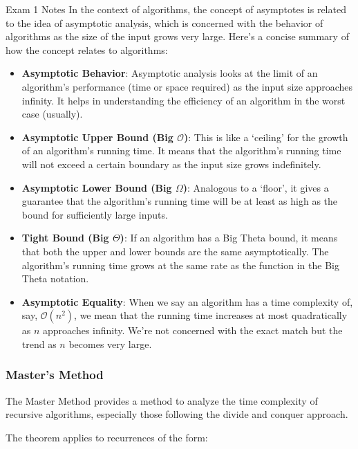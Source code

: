 \begin{examnotes}{Exam 1 Notes}
    In the context of algorithms, the concept of asymptotes is related to the idea of asymptotic analysis, which is concerned with the behavior of algorithms as the size of the input grows very large. 
    Here's a concise summary of how the concept relates to algorithms:

    \begin{itemize}
        \item \textbf{Asymptotic Behavior}: Asymptotic analysis looks at the limit of an algorithm's performance (time or space required) as the input size approaches infinity. It helps in understanding 
        the efficiency of an algorithm in the worst case (usually).
        \item \textbf{Asymptotic Upper Bound (Big $\mathcal{O}$)}: This is like a `ceiling' for the growth of an algorithm's running time. It means that the algorithm's running time will not exceed 
        a certain boundary as the input size grows indefinitely.
        \item \textbf{Asymptotic Lower Bound (Big $\Omega$)}: Analogous to a `floor', it gives a guarantee that the algorithm's running time will be at least as high as the bound for sufficiently 
        large inputs.
        \item \textbf{Tight Bound (Big $\Theta$)}: If an algorithm has a Big Theta bound, it means that both the upper and lower bounds are the same asymptotically. The algorithm's running time grows 
        at the same rate as the function in the Big Theta notation.
        \item \textbf{Asymptotic Equality}: When we say an algorithm has a time complexity of, say, $\mathcal{O}(n^{2})$, we mean that the running time increases at most quadratically as $n$ approaches
        infinity. We're not concerned with the exact match but the trend as $n$ becomes very large.
    \end{itemize}

    \subsubsection*{Master's Method}

    The Master Method provides a method to analyze the time complexity of recursive algorithms, especially those following the divide and conquer approach.

    \begin{highlight}
        The theorem applies to recurrences of the form:
    

\end{highlight}
\end{examnotes}
